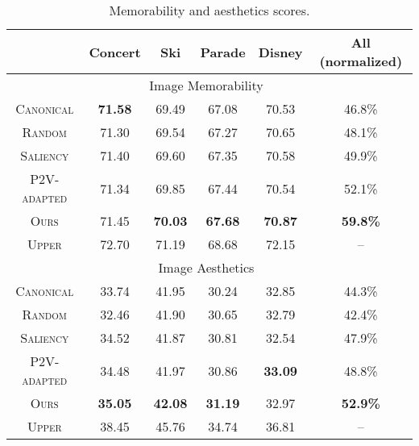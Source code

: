 \begin{table}[t]

\centering
{\scriptsize \begin{tabular}{ |c|c|c|c|c|c|}
\hline

   & Concert           & Ski              & Parade                  & Disney                         &  All (normalized)    \\ \hline
\multicolumn{6}{|c|}{Image Memorability~\cite{ICCV15_Khosla}} \\ \hline 
\textsc{Canonical} & \textbf{71.58}    & 69.49          & 67.08          & 70.53                 & 46.8\%                 \\ \hline
\textsc{Random}    & 71.30             & 69.54          & 67.27          &70.65                 &  48.1\%                 \\ \hline 
\textsc{Saliency} & 71.40    & 69.60          & 67.35         & 70.58                 & 49.9\%                 \\ \hline
\textsc{P2V-adapted}    & 71.34             & 69.85          & 67.44          &70.54                 &  52.1\%                 \\ \hline
\textsc{Ours}      & 71.45             & \textbf{70.03} & \textbf{67.68} & \textbf{70.87}        &  \textbf{59.8\%} \\ \hline\hline
\textsc{Upper}     & 72.70             & 71.19          & 68.68          & 72.15                 &  --        \\ \hline
\multicolumn{6}{|c|}{Image  Aesthetics~\cite{kong2016aesthetics}}  \\ \hline
\textsc{Canonical} & 33.74             & 41.95           & 30.24          & 32.85                 &  44.3\% \\ \hline
\textsc{Random}    & 32.46             & 41.90           & 30.65          & 32.79                 &  42.4\% \\ \hline
\textsc{Saliency} & 34.52    & 41.87          & 30.81          & 32.54                 & 47.9\%                 \\ \hline
\textsc{P2V-adapted}    & 34.48             & 41.97          & 30.86          &\textbf{33.09}                 &  48.8\%                 \\ \hline
\textsc{Ours}      & \textbf{35.05}    & \textbf{42.08}  & \textbf{31.19}  & 32.97      &  \textbf{52.9\%} \\ \hline\hline
\textsc{Upper}     & 38.45                  & 45.76                & 34.74               & 36.81                      &  --    \\ \hline
\end{tabular}}

\vspace{4pt}
\caption{Memorability and aesthetics scores.}

\label{tab:img_pro}
\vspace{-25pt}
\end{table}





